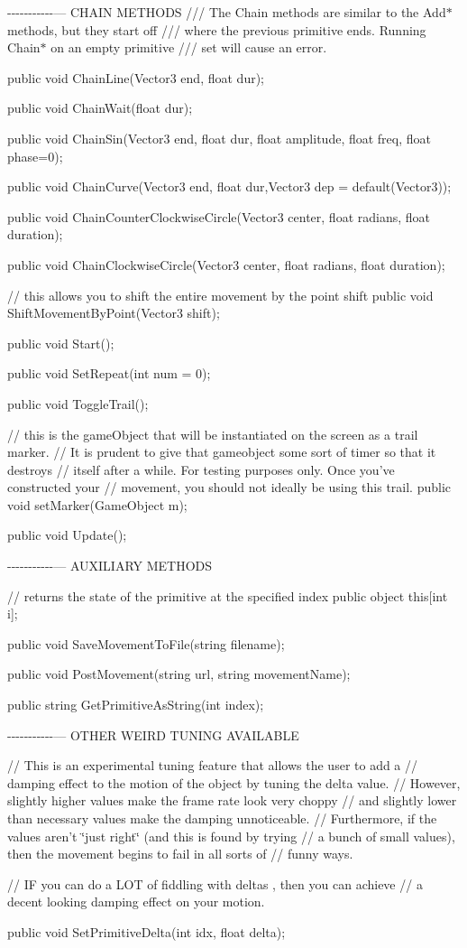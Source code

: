 -\/-\/-\/-\/-\/-\/-\/-\/-\/-\/-\/--- C\+H\+A\+I\+N M\+E\+T\+H\+O\+D\+S /// The Chain methods are similar to the Add$\ast$ methods, but they start off /// where the previous primitive ends. Running Chain$\ast$ on an empty primitive /// set will cause an error.

public void Chain\+Line(\+Vector3 end, float dur);

public void Chain\+Wait(float dur);

public void Chain\+Sin(Vector3 end, float dur, float amplitude, float freq, float phase=0);

public void Chain\+Curve(Vector3 end, float dur,Vector3 dep = default(\+Vector3));

public void Chain\+Counter\+Clockwise\+Circle(\+Vector3 center, float radians, float duration);

public void Chain\+Clockwise\+Circle(\+Vector3 center, float radians, float duration);





// this allows you to shift the entire movement by the point shift public void Shift\+Movement\+By\+Point(\+Vector3 shift);

public void Start();

public void Set\+Repeat(int num = 0);

public void Toggle\+Trail();

// this is the game\+Object that will be instantiated on the screen as a trail marker. // It is prudent to give that gameobject some sort of timer so that it destroys // itself after a while. For testing purposes only. Once you've constructed your // movement, you should not ideally be using this trail. public void set\+Marker(\+Game\+Object m);

public void Update();

-\/-\/-\/-\/-\/-\/-\/-\/-\/-\/-\/--- A\+U\+X\+I\+L\+I\+A\+R\+Y M\+E\+T\+H\+O\+D\+S

// returns the state of the primitive at the specified index public object this\mbox{[}int i\mbox{]};

public void Save\+Movement\+To\+File(string filename);

public void Post\+Movement(string url, string movement\+Name);

public string Get\+Primitive\+As\+String(int index);

-\/-\/-\/-\/-\/-\/-\/-\/-\/-\/-\/--- O\+T\+H\+E\+R W\+E\+I\+R\+D T\+U\+N\+I\+N\+G A\+V\+A\+I\+L\+A\+B\+L\+E

// This is an experimental tuning feature that allows the user to add a // damping effect to the motion of the object by tuning the delta value. // However, slightly higher values make the frame rate look very choppy // and slightly lower than necessary values make the damping unnoticeable. // Furthermore, if the values aren't \char`\"{}just right\char`\"{} (and this is found by trying // a bunch of small values), then the movement begins to fail in all sorts of // funny ways.

// I\+F you can do a L\+O\+T of fiddling with deltas , then you can achieve // a decent looking damping effect on your motion.

public void Set\+Primitive\+Delta(int idx, float delta); 
